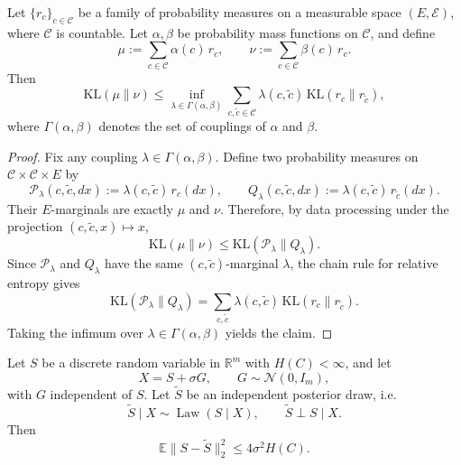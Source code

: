 \documentclass[twoside,11pt]{article}
\newcommand{\R}{\mathbb{R}}
\newcommand{\E}{\mathbb{E}}
\newcommand{\Nc}{\mathcal{N}}
\newcommand{\KL}{\mathrm{KL}}
\newcommand{\Law}{\operatorname{Law}}
\numberwithin{equation}{section}
\begin{document}
\begin{lemma}
\label{lem:mixture_kl_coupling}
Let \(\{r_c\}_{c\in\mathcal C}\) be a family of probability measures on a measurable space
\((E,\mathcal E)\), where \(\mathcal C\) is countable. Let \(\alpha,\beta\) be probability
mass functions on \(\mathcal C\), and define
\[
\mu:=\sum_{c\in\mathcal C}\alpha(c)\,r_c,
\qquad
\nu:=\sum_{c\in\mathcal C}\beta(c)\,r_c.
\]
Then
\[
\KL(\mu\|\nu)
\le
\inf_{\lambda\in\Gamma(\alpha,\beta)}
\sum_{c,\tilde c\in\mathcal C}\lambda(c,\tilde c)\,
\KL(r_c\|r_{\tilde c}),
\]
where \(\Gamma(\alpha,\beta)\) denotes the set of couplings of \(\alpha\) and \(\beta\).
\end{lemma}

\begin{proof}
Fix any coupling \(\lambda\in\Gamma(\alpha,\beta)\). Define two probability measures on
\(\mathcal C\times\mathcal C\times E\) by
\[
\mathcal{P}_\lambda(c,\tilde c,dx):=\lambda(c,\tilde c)\,r_c(dx),
\qquad
Q_\lambda(c,\tilde c,dx):=\lambda(c,\tilde c)\,r_{\tilde c}(dx).
\]
Their \(E\)-marginals are exactly \(\mu\) and \(\nu\). Therefore, by data processing under
the projection \((c,\tilde c,x)\mapsto x\),
\[
\KL(\mu\|\nu)\le \KL(\mathcal{P}_\lambda\|Q_\lambda).
\]
Since \(\mathcal{P}_\lambda\) and \(Q_\lambda\) have the same \((c,\tilde c)\)-marginal \(\lambda\),
the chain rule for relative entropy gives
\[
\KL(\mathcal{P}_\lambda\|Q_\lambda)
=
\sum_{c,\tilde c}\lambda(c,\tilde c)\,\KL(r_c\|r_{\tilde c}).
\]
Taking the infimum over \(\lambda\in\Gamma(\alpha,\beta)\) yields the claim.
\end{proof}

\begin{lemma}
\label{lem:posterior_resample_shannon}
Let \(S\) be a discrete random variable in \(\R^m\) with \(H(C)<\infty\), and let
\[
X=S+\sigma G,
\qquad
G\sim\Nc(0,I_m),
\]
with \(G\) independent of \(S\). Let \(\tilde S\) be an independent posterior draw, i.e.
\[
\tilde S\mid X \sim \Law(S\mid X),
\qquad
\tilde S \perp S \mid X.
\]
Then
\[
\E\|S-\tilde S\|_2^2 \le 4\sigma^2 H(C).
\]
\end{lemma}
\end{document}
